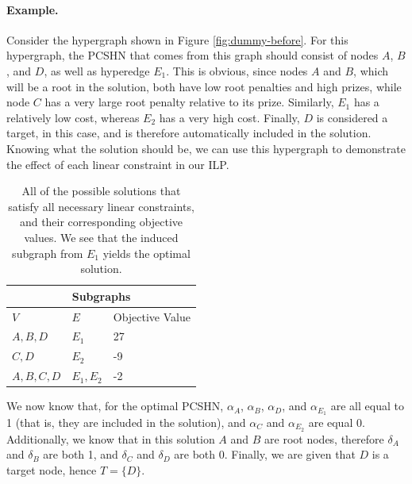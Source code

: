 \documentclass[12pt,twoside]{reedthesis}
\theoremstyle{definition}
\begin{document}
\paragraph{Example.}Consider the hypergraph shown in Figure \ref{fig:dummy-before}. For this hypergraph, the PCSHN that comes from this graph should consist of nodes $A$, $B$, and $D$, as well as hyperedge $E_1$. This is obvious, since nodes $A$ and $B$, which will be a root in the solution, both have low root penalties and high prizes, while node $C$ has a very large root penalty relative to its prize. Similarly, $E_1$ has a relatively low cost, whereas $E_2$ has a very high cost. Finally, $D$ is considered a target, in this case, and is therefore automatically included in the solution. Knowing what the solution should be, we can use this hypergraph to demonstrate the effect of each linear constraint in our ILP.\par

\begin{table}[!h]
\begin{center}
  \label{tab:obj_values_dummy}
  \caption[Objective values of dummy hypergraph.]{All of the possible solutions that satisfy all necessary linear constraints, and their corresponding objective values. We see that the induced subgraph from $E_1$ yields the optimal solution.}
\begin{tabular}{ |l|l|l| }%
  \hline%
  \multicolumn{3}{|c|}{Subgraphs} \\%
  \hline \hline
  $V$ & $E$ & Objective Value \\ \hline%
  $A,B,D$ & $E_1$ & 27 \\ \hline%
  $C,D$ & $E_2$ & -9 \\ \hline%
  $A,B,C,D$ & $E_1,E_2$ & -2 \\ \hline%
\end{tabular}%
\end{center}
\end{table}

We now know that, for the optimal PCSHN, $\alpha_A$, $\alpha_B$, $\alpha_D$, and $\alpha_{E_1}$ are all equal to 1 (that is, they are included in the solution), and $\alpha_C$ and $\alpha_{E_2}$ are equal 0. Additionally, we know that in this solution $A$ and $B$ are root nodes, therefore $\delta_A$ and $\delta_B$ are both 1, and $\delta_C$ and $\delta_D$ are both 0. Finally, we are given that $D$ is a target node, hence $T=\{D\}$.\par
\end{document}
